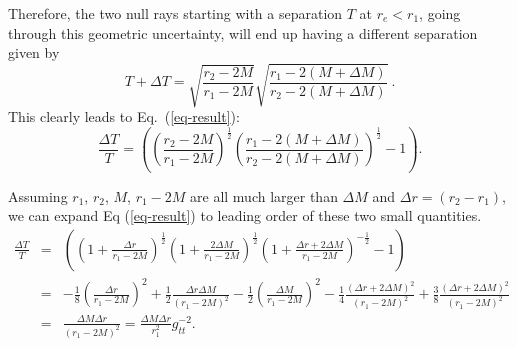 \documentclass[aps,showpacs,onecolumn,floats,prd,superscriptaddress,nofootinbib]{revtex4-1}
\begin{document}
Therefore, the two null rays starting with a separation $T$ at $r_e<r_1$, going through this geometric uncertainty, will end up having a different separation given by
\begin{equation}
T+\Delta T = \sqrt{\frac{r_2-2M}{r_1-2M}} \sqrt{\frac{r_1-2(M+\Delta M)}{r_2-2(M+\Delta M)}}~.
\end{equation}
This clearly leads to Eq.~(\ref{eq-result}):
\begin{equation}
	\frac{\Delta T}{T} 
	= \left( \left( \frac{r_2 - 2M}{r_1 - 2M} \right)^\frac{1}{2} \left( \frac{r_1 - 2(M+\Delta M)}{r_2 - 2(M+\Delta M)} \right)^\frac{1}{2} - 1\right).	\label{10}
\end{equation}

Assuming $r_1$, $r_2$, $M$, $r_1-2M$ are all much larger than $\Delta M$ and $\Delta r=(r_2-r_1)$, we can expand Eq (\ref{eq-result}) to leading order of these two small quantities.
\begin{eqnarray}
	\frac{\Delta T}{T} & = & 
	\left( \left( 1+ \frac{\Delta r}{r_1 - 2M} \right)^\frac{1}{2} \left( 1 + \frac{2\Delta M}{r_1 - 2M} \right)^\frac{1}{2} \left( 1 + \frac{\Delta r + 2 \Delta M}{r_1 - 2M} \right)^{-\frac{1}{2}} - 1 \right)	\nonumber	\\
	& = & - \frac{1}{8} \left( \frac{\Delta r}{r_1 - 2M} \right)^2 + 
	\frac{1}{2} \frac{\Delta r \Delta M}{(r_1 - 2M)^2} - 
	\frac{1}{2} \left( \frac{\Delta M}{r_1 - 2M} \right)^2 - 
	\frac{1}{4} \frac{( \Delta r + 2 \Delta M)^2}{(r_1 - 2M)^2} + 
	\frac{3}{8} \frac{(\Delta r+ 2 \Delta M)^2}{(r_1 - 2M)^2} 	\nonumber	\\
	& = & \frac{\Delta M \Delta r}{(r_1 - 2M)^2} = \frac{\Delta M \Delta r}{r_1^2} g_{tt}^{-2}.
\end{eqnarray}
	
\end{document}
